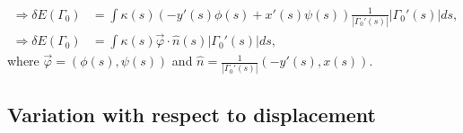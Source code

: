 \documentclass[10pt,a4paper]{article}
\begin{document}
%
\begin{align*}
\Rightarrow \delta E(\Gamma_0) &= \int \kappa(s) \left( -y'(s)\phi(s) + x'(s)\psi(s) \right) \frac{1}{|\Gamma_0'(s)|} |\Gamma_0'(s)| ds, \\
\Rightarrow \delta E(\Gamma_0) &= \int \kappa(s) \vec{\varphi}\cdot \hat{n}(s)|\Gamma_0'(s)| ds,
\end{align*}
where $\vec{\varphi} = (\phi(s),\psi(s))$ and $\hat{n} = \frac{1}{|\Gamma_0'(s)|}(-y'(s),x(s))$.

\subsection{Variation with respect to displacement}
\end{document}
